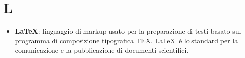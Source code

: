 \section{L}
\begin{itemize} 
	\item \textbf{\LaTeX}: linguaggio di markup usato per la preparazione di testi basato sul programma di composizione tipografica TEX. \LaTeX\ è lo standard per la comunicazione e la pubblicazione di documenti scientifici.	
\end{itemize}